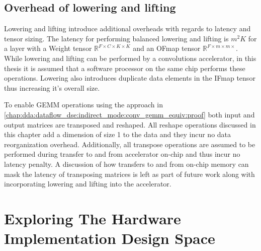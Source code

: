 \subsection{Overhead of lowering and lifting}
\label{chap:dda:dataflow_dse:indirect_mode:overhead}

Lowering and lifting introduce additional overheads with regards to latency and
tensor sizing. The latency for performing balanced lowering and lifting is
$m^{2}K$ for a layer with a Weight tensor $\mathbb{R}^{F\times C\times K\times
K}$ and an OFmap tensor $\mathbb{R}^{F\times m\times m\times}$. While lowering
and lifting can be performed by a convolutions accelerator, in this thesis it is
assumed that a software processor on the same chip performs these operations.
Lowering also introduces duplicate data elements in the IFmap tensor thus
increasing it's overall size. 

To enable GEMM operations using the approach in
\autoref{chap:dda:dataflow_dse:indirect_mode:conv_gemm_equiv:proof} both input
and output matrices are transposed and reshaped. All reshape operations
discussed in this chapter add a dimension of size 1 to the data and they incur
no data reorganization overhead. Additionally, all transpose operations are
assumed to be performed during transfer to and from accelerator on-chip and thus
incur no latency penalty. A discussion of how transfers to and from on-chip
memory can mask the latency of transposing matrices is left as part of future
work along with incorporating lowering and lifting into the accelerator. 


\section{Exploring The Hardware Implementation Design Space}
\label{chap:dda:hw_dse}

